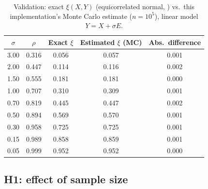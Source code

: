 \documentclass[article]{ajs}
\begin{document}
\begin{table}[H]
\caption{\label{tab:validation}Validation: exact $\xi(X,Y)$ (equicorrelated normal, \citealp{ansari2026}) vs.\ this implementation's Monte Carlo estimate ($n=10^5$), linear model $Y=X+\sigma E$.}
\begin{center}
\small
\begin{tabular}{ccccc}
\toprule
$\sigma$ & $\rho$ & Exact $\xi$ & Estimated $\xi$ (MC) & Abs.\ difference \\
\midrule
3.00 & 0.316 & 0.056 & 0.057 & 0.001 \\
2.00 & 0.447 & 0.114 & 0.116 & 0.002 \\
1.50 & 0.555 & 0.181 & 0.181 & 0.000 \\
1.00 & 0.707 & 0.310 & 0.309 & 0.001 \\
0.70 & 0.819 & 0.445 & 0.447 & 0.002 \\
0.50 & 0.894 & 0.569 & 0.570 & 0.001 \\
0.30 & 0.958 & 0.725 & 0.725 & 0.001 \\
0.15 & 0.989 & 0.858 & 0.859 & 0.001 \\
0.05 & 0.999 & 0.952 & 0.952 & 0.000 \\
\bottomrule
\end{tabular}
\end{center}
\end{table}

\subsection{H1: effect of sample size}
\end{document}
